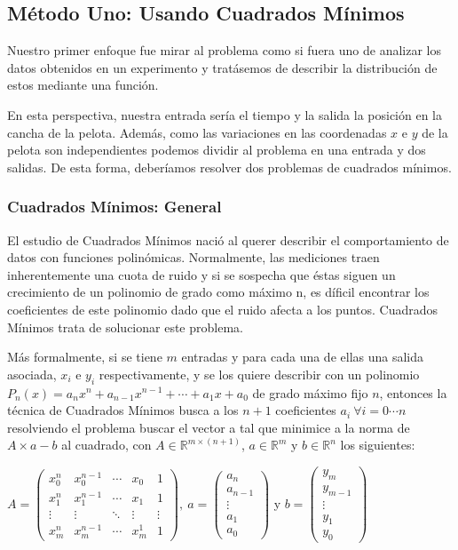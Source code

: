 \subsection{Método Uno: Usando Cuadrados Mínimos}
Nuestro primer enfoque fue mirar al problema como si fuera uno de analizar los datos obtenidos en un
experimento y tratásemos de describir la distribución de estos mediante una función.

En esta perspectiva, nuestra entrada sería el tiempo y la salida la posición en la cancha de la
pelota. Además, como las variaciones en las coordenadas $x$ e $y$ de la pelota son independientes
podemos dividir al problema en una entrada y dos salidas. De esta forma, deberíamos resolver dos
problemas de cuadrados mínimos.

\subsubsection{Cuadrados Mínimos: General}
El estudio de Cuadrados Mínimos nació al querer describir el comportamiento de datos con funciones
polinómicas. Normalmente, las mediciones traen inherentemente una cuota de ruido y si se sospecha
que éstas siguen un crecimiento de un polinomio de grado como máximo n, es díficil encontrar los
coeficientes de este polinomio dado que el ruido afecta a los puntos. Cuadrados Mínimos trata de
solucionar este problema.

Más formalmente, si se tiene $m$ entradas y para cada una de ellas una salida asociada, $x_i$ e
$y_i$ respectivamente, y se los quiere describir con un polinomio $P_n(x) = a_n x^n+a_{n-1}x^{n-1} +
\cdots + a_1x + a_0$ de grado máximo fijo $n$, entonces la técnica de Cuadrados Mínimos busca a los
$n+1$ coeficientes $a_i \ \forall i=0\cdots n$ resolviendo el problema buscar el vector a tal que
minimice a la norma de $A \times a - b$ al cuadrado, con $A \in \mathbb{R}^{m\times (n+1)}$,
$a \in \mathbb{R}^m$ y $b \in \mathbb{R}^n$ los siguientes:

  $ A = \begin{pmatrix}
    x_0^n & x_0^{n-1} & \cdots &  x_0  & 1 \\
    x_1^{n} & x_1^{n-1} & \cdots & x_1 & 1 \\
    \vdots  & \vdots  & \ddots & \vdots  & \vdots \\
    x_m^{n} & x_m^{n-1} & \cdots & x_m^1 & 1
              \end{pmatrix}, \ 
   a = \begin{pmatrix}
        a_n \\
        a_{n-1} \\
        \vdots \\
        a_1 \\
        a_0
       \end{pmatrix}
  $ y $
  b = \begin{pmatrix}
        y_m \\
        y_{m-1} \\
        \vdots \\
        y_1 \\
        y_0
       \end{pmatrix}
  $

